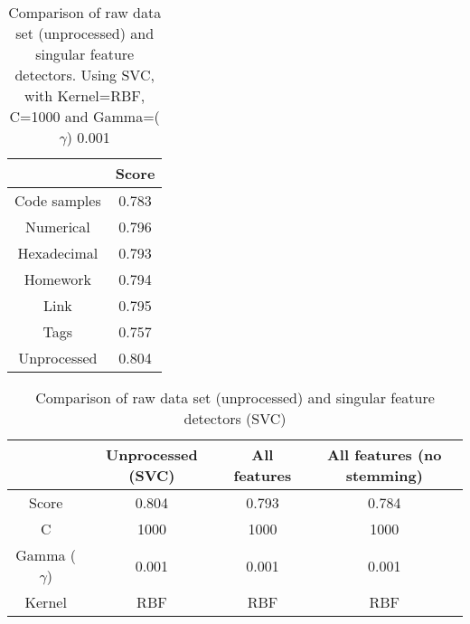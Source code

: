 \begin{table}[tbp]
	\centering
	\begin{tabular}{| c | c |}
		\hline
		~ 				& Score	\\ \hline
		Code samples 	& 0.783	\\ \hline
		Numerical		& 0.796	\\ \hline
		Hexadecimal		& 0.793	\\ \hline
		Homework 		& 0.794	\\ \hline
		Link			& 0.795	\\ \hline
		Tags			& 0.757	\\ \hline
		Unprocessed		& 0.804 \\ \hline
	\end{tabular}
	\caption{Comparison of raw data set (unprocessed) and singular feature detectors. Using SVC, with Kernel=RBF, C=1000 and Gamma=($\gamma$) 0.001}
	\label{tab:singular_feature_detector_so}
\end{table}


\begin{table}[tbp]
	\centering
	\begin{tabular}{| c | c | c | c |}
		\hline
		~ 					& Unprocessed (SVC)	& All features	& All features (no stemming)	\\ \hline
		Score 				& 0.804				& 0.793			& 0.784							\\ \hline
		C					& 1000				& 1000			& 1000							\\ \hline
		Gamma ($\gamma$)	& 0.001				& 0.001			&  0.001							\\ \hline
		Kernel				& RBF				& RBF			& RBF							\\ \hline
	\end{tabular}
	\caption{Comparison of raw data set (unprocessed) and singular feature detectors (SVC)}
	\label{tab:unprocessed_vs_all_feature_detectors_svc_so}
\end{table}

